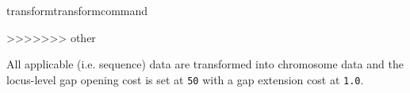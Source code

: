 \begin{command}{transform}{transformcommand}
\begin{poyexamples}
>>>>>>> other
          
          
            {All applicable (i.e. sequence) data are transformed into chromosome data 
            and the locus-level gap opening cost is set at \texttt{50} with a gap extension cost at \texttt{1.0}.}
                                
    \end{poyexamples}        

\end{command}




